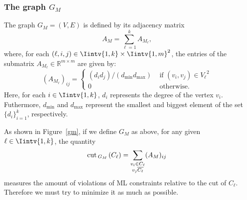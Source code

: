 \subsubsection*{The graph $G_M$}
\begin{definition}
   The graph $G_M = (V,E)$ is defined by its adjacency matrix 
\begin{equation}
   A_M = \sum_{\ell = 1}^k A_{M_{\ell}},
\end{equation}
   where, for each $(\ell, i, j) \in \Iintv{1,k} \times \Iintv{1, m}^2$, the entries of the submatrix $A_{M_{\ell}} \in \mathbb R^{m \times m}$ are given by:
   \begin{equation}
      (A_{M_{\ell}})_{ij} =
      \begin{cases}
         (d_i d_j) / (d_{\min} d_{\max}) & \text{ if $(v_i, v_j) \in {V_{\ell}}^2$} \\
         0 & \text{ otherwise.}
      \end{cases}
   \end{equation}
   Here, for each $i \in \Iintv{1,k}$, $d_i$ represents the degree of the vertex $v_i$. 
   Futhermore, $d_{\min}$ and $d_{\max}$ represent the smallest and biggest element of the set $\{ d_i \}_{i=1}^k$, respectively.
\end{definition}

As shown in Figure~\vref{gm}, if we define $G_M$ as above, for any given $\ell \in \Iintv{1,k}$, the quantity
\begin{equation}
   \operatorname{cut\,}_{G_M\,}(C_{\ell}) = \sum_{\substack{v_i \in C_{\ell} \\ v_j \overline{C_{\ell}}}} (A_M)_{ij} 
\end{equation}
measures the amount of violations of ML constraints relative to the cut of $C_{\ell}$.
Therefore we must try to minimize it as much as possible.

